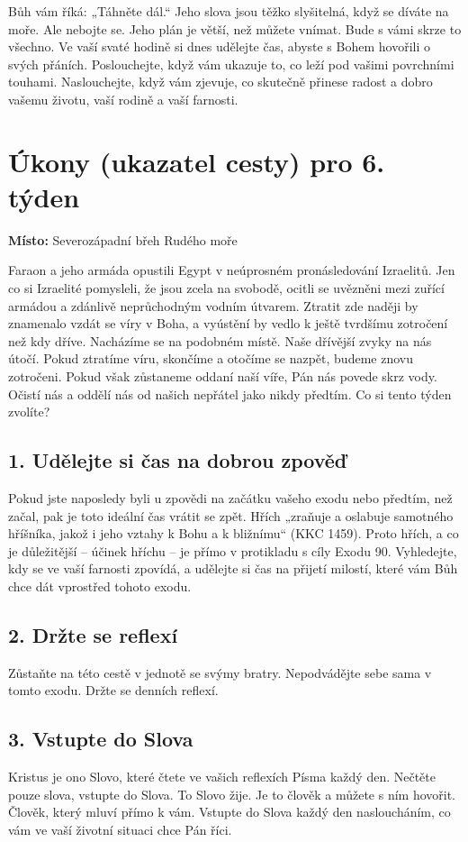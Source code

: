 \documentclass[11pt]{article}
\begin{document}
Bůh vám říká: „Táhněte dál.“ Jeho slova jsou těžko slyšitelná, když se díváte na moře. Ale nebojte se. Jeho plán je
větší, než můžete vnímat. Bude s vámi skrze to všechno. Ve vaší svaté hodině si dnes udělejte čas, abyste s Bohem
hovořili o svých přáních. Poslouchejte, když vám ukazuje to, co leží pod vašimi povrchními touhami. Naslouchejte,
když vám zjevuje, co skutečně přinese radost a dobro vašemu životu, vaší rodině a vaší farnosti.

\newpage
\section*{Úkony (ukazatel cesty) pro 6. týden}

\textbf{Místo:} Severozápadní břeh Rudého moře

Faraon a jeho armáda opustili Egypt v neúprosném pronásledování Izraelitů. Jen co si Izraelité pomysleli, že jsou zcela na svobodě, ocitli se uvězněni mezi zuřící armádou a zdánlivě neprůchodným vodním útvarem. Ztratit zde naději by znamenalo vzdát se víry v Boha, a vyústění by vedlo k ještě tvrdšímu zotročení než kdy dříve. Nacházíme se na podobném místě. Naše dřívější zvyky na nás útočí. Pokud ztratíme víru, skončíme a otočíme se nazpět, budeme znovu zotročeni. Pokud však zůstaneme oddaní naší víře, Pán nás povede skrz vody. Očistí nás a oddělí nás od našich nepřátel jako nikdy předtím. Co si tento týden zvolíte?

\subsection*{1. Udělejte si čas na dobrou zpověď}
Pokud jste naposledy byli u zpovědi na začátku vašeho exodu nebo předtím, než začal, pak je toto ideální čas vrátit se zpět. Hřích „zraňuje a oslabuje samotného hříšníka, jakož i jeho vztahy k Bohu a k bližnímu“ (KKC 1459). Proto hřích, a co je důležitější – účinek hříchu – je přímo v protikladu s cíly Exodu 90. Vyhledejte, kdy se ve vaší farnosti zpovídá, a udělejte si čas na přijetí milostí, které vám Bůh chce dát vprostřed tohoto exodu.
\subsection*{2. Držte se reflexí}
Zůstaňte na této cestě v jednotě se svýmy bratry. Nepodvádějte sebe sama v tomto exodu. Držte se denních reflexí.
\subsection*{3. Vstupte do Slova}
Kristus je ono Slovo, které čtete ve vašich reflexích Písma každý den. Nečtěte pouze slova, vstupte do Slova. To Slovo žije. Je to člověk a můžete s ním hovořit. Člověk, který mluví přímo k vám. Vstupte do Slova každý den nasloucháním, co vám ve vaší životní situaci chce Pán říci.
\end{document}
